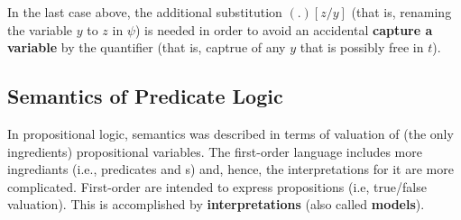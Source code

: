 \documentclass[english, 11pt]{article}
\begin{document}
  In the last case above, the additional substitution $(.)[z/y]$ (that is, renaming the variable $y$ to $z$ in $\psi$) is needed in order to avoid an accidental \textbf{capture a variable} by the quantifier (that is, captrue of any $y$ that is possibly free in $t$).
  \subsection{Semantics of Predicate Logic}
  In propositional logic, semantics was described in terms of valuation of (the only ingredients) propositional variables. The first-order language includes more ingrediants (i.e., predicates and s) and, hence, the interpretations for it are more complicated. First-order  are intended to express propositions (i.e, true/false valuation). This is accomplished by \textbf{interpretations} (also called \textbf{models}). \\
\end{document}

